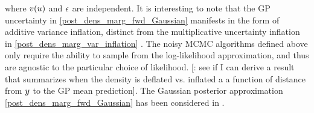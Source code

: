 \documentclass[12pt]{article}
\begin{document}
where $v(u)$ and $\epsilon$ are independent. It is interesting to note that the GP uncertainty in 
\ref{post_dens_marg_fwd_Gaussian} manifests in the form of additive variance inflation, distinct 
from the multiplicative uncertainty inflation in \ref{post_dens_marg_var_inflation} \citep{GP_PDE_priors}.
The noisy MCMC algorithms defined above only require the ability to sample from the log-likelihood
approximation, and thus are agnostic to the particular choice of likelihood. 
[\todo: see if I can derive a result that summarizes when the density is deflated vs. inflated a a function 
of distance from $y$ to the GP mean prediction].  
The Gaussian posterior approximation \ref{post_dens_marg_fwd_Gaussian} has been considered in 
\cite{StuartTeck2, hydrologicalModel, GP_PDE_priors, GP_PDE_priors, CES, idealizedGCM, weightedIVAR, trainDynamics}.


\end{document}
